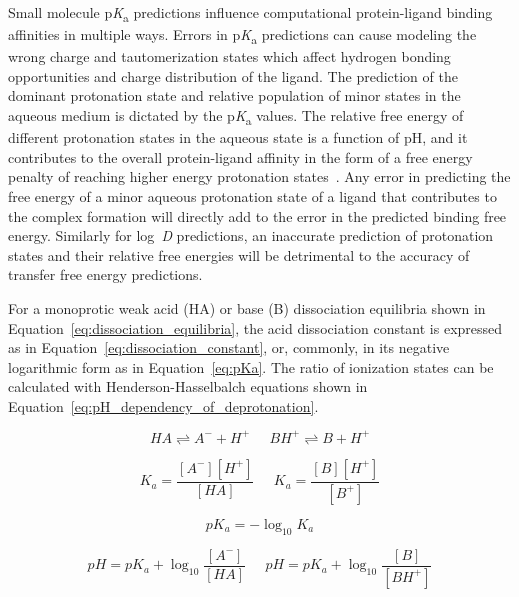 \documentclass[9pt,lineno,final]{elife}
\newcommand{\pKa}{p\textit{K}\textsubscript{a}}
\newcommand{\logD}{log~\textit{D}}
\begin{document}
Small molecule \pKa{} predictions influence computational protein-ligand binding affinities in multiple ways. 
Errors in \pKa{} predictions can cause modeling the wrong charge and tautomerization states which affect hydrogen bonding opportunities and charge distribution of the ligand.
The prediction of the dominant protonation state and relative population of minor states in the aqueous medium is dictated by the \pKa{} values. 
The relative free energy of different protonation states in the aqueous state is a function of pH, and it contributes to the overall protein-ligand affinity in the form of a free energy penalty of reaching higher energy protonation states~\citep{deOliveira:2019:J.Chem.TheoryComput.}.
Any error in predicting the free energy of a minor aqueous protonation state of a ligand that contributes to the complex formation will directly add to the error in the predicted binding free energy. 
Similarly for \logD{} predictions, an inaccurate prediction of protonation states and their relative free energies will be detrimental to the accuracy of transfer free energy predictions.


For a monoprotic weak acid (HA) or base (B) dissociation equilibria shown in Equation~\ref{eq:dissociation_equilibria}, the acid dissociation constant is expressed as in Equation~\ref{eq:dissociation_constant}, or, commonly, in its negative logarithmic form as in Equation~\ref{eq:pKa}. 
The ratio of ionization states can be calculated with Henderson-Hasselbalch equations shown in Equation~\ref{eq:pH_dependency_of_deprotonation}. 

\begin{equation}
HA \rightleftharpoons A^- + H^+ \;\;\;\;\; BH^+ \rightleftharpoons B + H^+
\label{eq:dissociation_equilibria}
\end{equation}

\begin{equation}
K_a = \frac{[A^-][H^+]}{[HA]}\;\;\;\;\;K_a = \frac{[B][H^+]}{[B^+]} 
\label{eq:dissociation_constant}
\end{equation}


\begin{equation}
pK_a = -\log_{10}{K_a}
\label{eq:pKa}
\end{equation}


\begin{equation}
pH = pK_a + \log_{10}{\frac{[A^-]}{[HA]}}\;\;\;\;\;pH = pK_a + \log_{10}{\frac{[B]}{[BH^+]}}
\label{eq:pH_dependency_of_deprotonation}
\end{equation}
\end{document}
